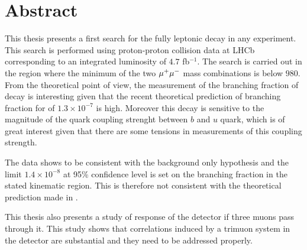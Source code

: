 \chapter*{Abstract}
\noindent
This thesis presents a first search for the fully leptonic decay \Bmumumu in any experiment. This search is performed using
proton-proton collision data at LHCb corresponding to an integrated luminosity of $4.7$ fb$^{-1}$. The search is carried out in the
region where the minimum of the two ${\mu^+\mu^-}$ mass combinations is below $980$\mevcc. From the theoretical point of view, the measurement of the branching fraction of decay is interesting given that the recent theoretical prediction \cite{Danilina:2018uzr} of branching fraction for \Bmumumu of $1.3 \times 10^{-7}$ is high. Moreover this decay is sensitive to the magnitude of the quark coupling strenght between $b$ and $u$ quark, which is of great interest given that there are some tensions in measurements of this coupling strength.

The data shows to be consistent with the background only hypothesis and the limit $1.4 \times 10^{-8}$ at 95\% confidence level is set on the branching fraction in the stated kinematic region. This is therefore not consistent with the theoretical prediction made in \cite{Danilina:2018uzr}.

This thesis also presents a study of response of the detector if three muons pass through it. This study shows that correlations induced by a trimuon system in the detector are substantial and they need to be addressed properly.



